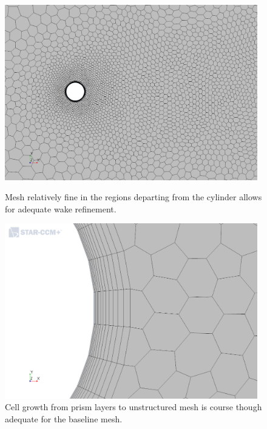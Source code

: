 \documentclass[10pt,english]{article}
\begin{document}
\begin{figure}[h]
\centering
\begin{minipage}{.49\textwidth}
  \centering
\includegraphics[trim={1.0cm 0cm 1.4cm 0.5cm},clip,width=0.98\textwidth]{cylinder_2_05_MeshScene2_2.png}
\caption{Mesh relatively fine in the regions departing from the cylinder allows for adequate wake refinement.}
\label{f:mesh05_2}
\end{minipage}%
\hspace{5pt}
\begin{minipage}{.49\textwidth}
  \centering
\includegraphics[trim={1.0cm 0cm 1.4cm .5cm},clip,width=0.98\textwidth]{cylinder_2_05_MeshScene2_3.png}
\caption{\vspace{10pt} Cell growth from prism layers to unstructured mesh is course though adequate for the baseline mesh.}
\label{f:mesh05_3}
\end{minipage}
\end{figure}
 
\end{document}
